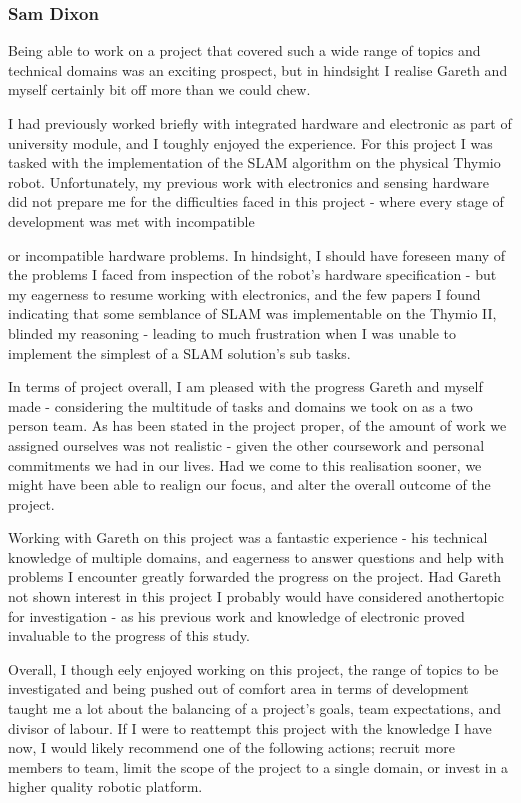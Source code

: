 \subsubsection{Sam Dixon}
Being able to work on a project that covered such a wide range of topics and
technical domains was an exciting prospect, but in hindsight I realise Gareth
and myself certainly bit off more than we could chew.

I had previously worked briefly with integrated hardware and electronic as
part of university module, and I toughly enjoyed the experience.
For this project I was tasked with the implementation of the SLAM algorithm on
the physical Thymio robot.
Unfortunately, my previous work with electronics and sensing hardware did not
prepare me for the difficulties faced in this project - where every stage of
development was met with incompatible


or incompatible hardware problems.
In hindsight, I should have foreseen many of the problems I faced from
inspection of the robot's hardware specification - but my eagerness to resume
working with electronics, and the few papers I found indicating that some
semblance of SLAM was implementable on the Thymio II, blinded my reasoning -
leading to much frustration when I was unable to implement the simplest of
a SLAM solution's sub tasks.

In terms of project overall, I am pleased with the progress Gareth and myself
made - considering the multitude of tasks and domains we took on as a two
person team.
As has been stated in the project proper, of the amount of work we assigned
ourselves was not realistic - given the other coursework and personal
commitments we had in our lives.
Had we come to this realisation sooner, we might have been able to realign our
focus, and alter the overall outcome of the project.

Working with Gareth on this project was a fantastic experience - his technical
knowledge of multiple domains, and eagerness to answer questions and help
with problems I encounter greatly forwarded the progress on the project.
Had Gareth not shown interest in this project I probably would have considered
anothertopic for investigation - as his previous work and knowledge of electronic
proved invaluable to the progress of this study.

Overall, I though eely enjoyed working on this project, the range of topics to
be investigated and being pushed out of comfort area in terms of development
taught me a lot about the balancing of a project's goals, team expectations,
and divisor of labour.
If I were to reattempt this project with the knowledge I have now, I would
likely recommend one of the following actions; recruit more members to team,
limit the scope of the project to a single domain, or invest in a higher
quality robotic platform.

